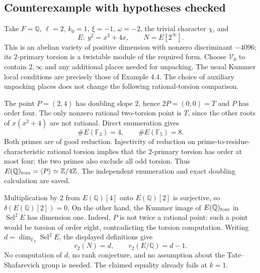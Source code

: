 \documentclass[10pt]{article}
\begin{document}
\subsection*{Counterexample with hypotheses checked}
Take \(F=\mathbb Q\), \(\ell=2\), \(k_0=1\), \(\xi=-1\), \(\omega=-2\), the trivial character \(\chi\), and \[E:\ y^2=x^3+4x,\qquad N=E[2^\infty].\] This is an abelian variety of positive dimension with nonzero discriminant \(-4096\); its \(2\)-primary torsion is a twistable module of the required form. Choose \(\mathcal V_0\) to contain \(2,\infty\) and any additional places needed for unpacking. The usual Kummer local conditions are precisely those of Example 4.4. The choice of auxiliary unpacking places does not change the following rational-torsion comparison.\par
The point \(P=(2,4)\) has doubling slope \(2\), hence \(2P=(0,0)=T\) and \(P\) has order four. The only nonzero rational two-torsion point is \(T\), since the other roots of \(x(x^2+4)\) are not rational. Direct enumeration gives \[\#E(\mathbb F_3)=4,\qquad \#E(\mathbb F_5)=8.\] Both primes are of good reduction. Injectivity of reduction on prime-to-residue-characteristic rational torsion implies that the \(2\)-primary torsion has order at most four; the two primes also exclude all odd torsion. Thus \(E(\mathbb Q)_{\rm tors}=\langle P\rangle\simeq\mathbb Z/4\mathbb Z\). The independent enumeration and exact doubling calculation are saved.\par
Multiplication by \(2\) from \(E(\mathbb Q)[4]\) onto \(E(\mathbb Q)[2]\) is surjective, so \(\delta(E(\mathbb Q)[2])=0\). On the other hand, the Kummer image of \(E(\mathbb Q)_{\rm tors}\) in \(\operatorname{Sel}^2 E\) has dimension one. Indeed, \(P\) is not twice a rational point: such a point would be torsion of order eight, contradicting the torsion computation. Writing \(d=\dim_{\mathbb F_2}\operatorname{Sel}^2 E\), the displayed definitions give \[r_2(N)=d,\qquad r_2(E/\mathbb Q)=d-1.\] No computation of \(d\), no rank conjecture, and no assumption about the Tate–Shafarevich group is needed. The claimed equality already fails at \(k=1\).\par
\end{document}

